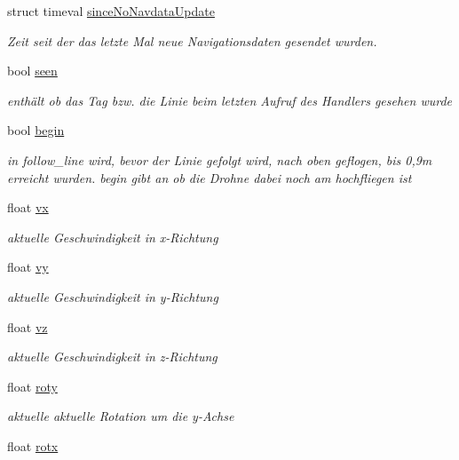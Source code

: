 \begin{DoxyCompactItemize}
struct timeval \hyperlink{class_cglobal_a9a9df79aad0bb5db8880a83d2fb407e2}{sinceNoNavdataUpdate}
\begin{DoxyCompactList}\small\item\em Zeit seit der das letzte Mal neue Navigationsdaten gesendet wurden. \end{DoxyCompactList}\item 
bool \hyperlink{class_cglobal_afe6f01a7ff64a3de6d0c8612f36511fd}{seen}
\begin{DoxyCompactList}\small\item\em enthält ob das Tag bzw. die Linie beim letzten Aufruf des Handlers gesehen wurde \end{DoxyCompactList}\item 
bool \hyperlink{class_cglobal_a2b9c1321be7adaacc3bed175e49fb02b}{begin}
\begin{DoxyCompactList}\small\item\em in follow\_\-line wird, bevor der Linie gefolgt wird, nach oben geflogen, bis 0,9m erreicht wurden. begin gibt an ob die Drohne dabei noch am hochfliegen ist \end{DoxyCompactList}\item 
float \hyperlink{class_cglobal_abafbed62176301706747c04ef3046aae}{vx}
\begin{DoxyCompactList}\small\item\em aktuelle Geschwindigkeit in x-\/Richtung \end{DoxyCompactList}\item 
float \hyperlink{class_cglobal_a0967372a0ede7b8b9a24957df663b7b3}{vy}
\begin{DoxyCompactList}\small\item\em aktuelle Geschwindigkeit in y-\/Richtung \end{DoxyCompactList}\item 
float \hyperlink{class_cglobal_af9ef9759f83ae67b7e220570a7738ef5}{vz}
\begin{DoxyCompactList}\small\item\em aktuelle Geschwindigkeit in z-\/Richtung \end{DoxyCompactList}\item 
float \hyperlink{class_cglobal_a5c1fac565d3813e798bd6aeb1c6fc8aa}{roty}
\begin{DoxyCompactList}\small\item\em aktuelle aktuelle Rotation um die y-\/Achse \end{DoxyCompactList}\item 
float \hyperlink{class_cglobal_ad295728f5113d9a47527cf14262dea0e}{rotx}

\end{DoxyCompactItemize}
